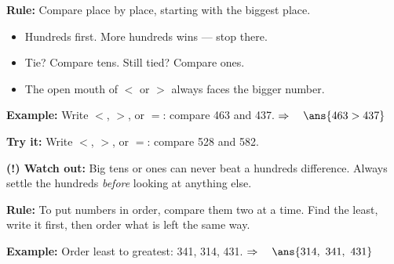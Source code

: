 \documentclass[12pt]{article}
\begin{document}


\begin{formulabox}
\textbf{Rule:} Compare place by place, starting with the biggest place.
\begin{itemize}[leftmargin=1.2cm, itemsep=1pt, topsep=2pt]
  \item Hundreds first. More hundreds wins --- stop there.
  \item Tie? Compare tens. Still tied? Compare ones.
  \item The open mouth of $<$ or $>$ always faces the bigger number.
\end{itemize}
\end{formulabox}

\begin{examplebox}
\textbf{Example:} \quad Write $<$, $>$, or $=$: compare 463 and 437.
$\Rightarrow\quad \ans{463 > 437}$
\end{examplebox}

\begin{tryitbox}
\textbf{Try it:} \quad Write $<$, $>$, or $=$: compare 528 and 582.\\[2pt]
\end{tryitbox}

\begin{watchoutbox}
\textbf{(!) Watch out:} Big tens or ones can never beat a hundreds
difference. Always settle the hundreds \emph{before} looking at anything
else.
\end{watchoutbox}


\begin{formulabox}
\textbf{Rule:} To put numbers in order, compare them two at a time.
Find the least, write it first, then order what is left the same way.
\end{formulabox}

\begin{examplebox}
\textbf{Example:} \quad Order least to greatest: 341, 314, 431.
$\Rightarrow\quad \ans{314,\ 341,\ 431}$
\end{examplebox}
\end{document}
